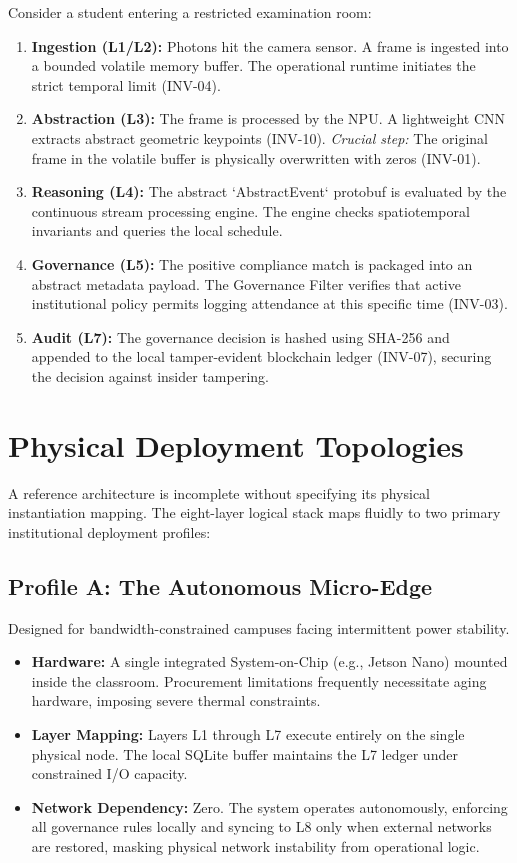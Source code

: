 \documentclass[conference]{IEEEtran}
\begin{document}
Consider a student entering a restricted examination room:
\begin{enumerate}
    \item \textbf{Ingestion (L1/L2):} Photons hit the camera sensor. A frame is ingested into a bounded volatile memory buffer. The operational runtime initiates the strict temporal limit (INV-04).
    \item \textbf{Abstraction (L3):} The frame is processed by the NPU. A lightweight CNN extracts abstract geometric keypoints (INV-10). \textit{Crucial step:} The original frame in the volatile buffer is physically overwritten with zeros (INV-01).
    \item \textbf{Reasoning (L4):} The abstract `AbstractEvent` protobuf is evaluated by the continuous stream processing engine. The engine checks spatiotemporal invariants and queries the local schedule.
    \item \textbf{Governance (L5):} The positive compliance match is packaged into an abstract metadata payload. The Governance Filter verifies that active institutional policy permits logging attendance at this specific time (INV-03).
    \item \textbf{Audit (L7):} The governance decision is hashed using SHA-256 and appended to the local tamper-evident blockchain ledger (INV-07), securing the decision against insider tampering.
\end{enumerate}

\section{Physical Deployment Topologies}
A reference architecture is incomplete without specifying its physical instantiation mapping. The eight-layer logical stack maps fluidly to two primary institutional deployment profiles:

\subsection{Profile A: The Autonomous Micro-Edge}
Designed for bandwidth-constrained campuses facing intermittent power stability.
\begin{itemize}
    \item \textbf{Hardware:} A single integrated System-on-Chip (e.g., Jetson Nano) mounted inside the classroom. Procurement limitations frequently necessitate aging hardware, imposing severe thermal constraints.
    \item \textbf{Layer Mapping:} Layers L1 through L7 execute entirely on the single physical node. The local SQLite buffer maintains the L7 ledger under constrained I/O capacity.
    \item \textbf{Network Dependency:} Zero. The system operates autonomously, enforcing all governance rules locally and syncing to L8 only when external networks are restored, masking physical network instability from operational logic.
\end{itemize}
\end{document}

